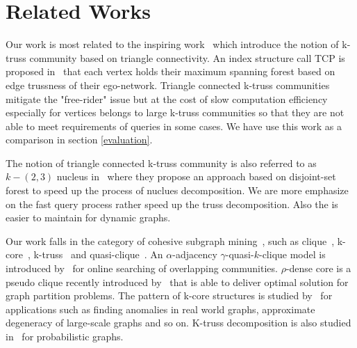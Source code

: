 \section{Related Works}
\label{relatedwork} 

Our work is most related to the inspiring work~\cite{huang2014querying} which introduce the notion of k-truss community based on triangle connectivity. An index structure call TCP is proposed in~\cite{huang2014querying} that each vertex holds their maximum spanning forest based on edge trussness of their ego-network. Triangle connected k-truss communities mitigate the "free-rider" issue but at the cost of slow computation efficiency especially for vertices belongs to large k-truss communities so that they are not able to meet requirements of queries in some cases. We have use this work as a comparison in section \autoref{evaluation}.

The notion of triangle connected k-truss community is also referred to as $k-(2,3)$ nucleus in~\cite{sariyuce2016fast} where they propose an approach based on disjoint-set forest to speed up the process of nuclues decomposition. We are more emphasize on the fast query process rather speed up the truss decomposition. Also the \treeindex{} is easier to maintain for dynamic graphs.

Our work falls in the category of cohesive subgraph mining~\cite{koujaku2016dense,sozio2010community,cui2014local,li2015influential,cui2013online,mcauley2012learning}, such as clique~\cite{bron1973algorithm,rossi2014fast}, k-core~\cite{cheng2011efficient,shin2016corescope}, k-truss~\cite{huang2014querying,wang2012truss,cohen2008trusses,huang2015approximate,huang2016truss} and quasi-clique~\cite{tsourakakis2013denser}. An $\alpha$-adjacency $\gamma$-quasi-$k$-clique model is introduced by~\cite{cui2014local} for online searching of overlapping communities. $\rho$-dense core is a pseudo clique recently introduced by~\cite{koujaku2016dense} that is able to deliver optimal solution for graph partition problems. The pattern of k-core structures is studied by~\cite{shin2016corescope} for applications such as finding anomalies in real world graphs, approximate degeneracy of large-scale graphs and so on. K-truss decomposition is also studied in~\cite{huang2016truss} for probabilistic graphs.

